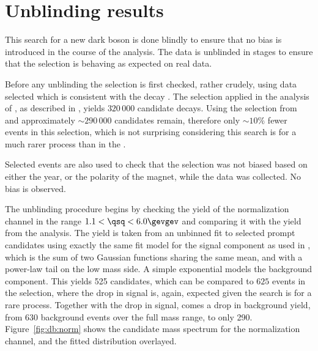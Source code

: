 \section{Unblinding results}

This search for a new dark boson is done blindly to ensure that no bias is introduced in the
course of the analysis.
The data is unblinded in stages to ensure that the selection is behaving as expected on real data.

Before any unblinding the selection is first checked, rather crudely, using data selected which is
consistent with the decay \decay{\Bd}{\jpsi\Kstarz}.
The selection applied in the \sm analysis of \btokstrmumu, as described in
, yields $320\,000$ candidate decays.
Using the selection from  and approximately $\sim290\,000$
\decay{\Bd}{\jpsi\Kstarz} candidates remain,
therefore only $\sim10\%$ fewer events in this selection, which is not surprising
considering this search is for a much rarer process than \decay{\Bd}{\Kstarz\mumu} in the \sm.

Selected \decay{\Bd}{\jpsi\Kstarz} events are also used to check that the selection was not biased
based on either the year, or the polarity of the \lhcb magnet, while the data was collected.
No bias is observed.


The unblinding procedure begins by checking the yield of the normalization channel
\btokstrmumu in the range $1.1<\qsq<6.0\gevgev$ and comparing it with the yield from the \sm
analysis.
The yield is taken from an unbinned fit to selected prompt \btokstrdb candidates using exactly the
same fit model for the signal component as used in , which is the sum of
two Gaussian functions sharing the same mean, and with a power-law tail on the low mass side.
A simple exponential models the background component.
This yields 525 \Bd candidates, which can be compared to \approx$625$ events in the \sm selection,
where the drop in signal is, again, expected given the search is for a rare process.
Together with the drop in signal, comes a drop in background yield, from \approx$630$ background
events over the full mass range, to only 290.
Figure~\ref{fig:db:norm} shows the \Bd candidate mass spectrum for the normalization channel, and
the fitted distribution overlayed.

